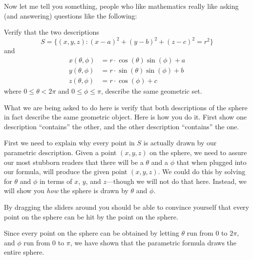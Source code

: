 \documentclass{ximera}
\begin{document}
 Now let me tell you something, people
who like mathematics really like asking (and answering) questions like
the following:

\begin{example}
  Verify that the two descriptions
  \[
  S = \{(x,y,z):(x-a)^2+(y-b)^2+(z-c)^2=r^2\}
  \]
  and
  \begin{align*}
    x(\theta,\phi) &=r\cdot\cos(\theta)\sin(\phi)+a\\
    y(\theta,\phi) &=r\cdot\sin(\theta)\sin(\phi)+b\\
    z(\theta,\phi) &=r\cdot\cos(\phi)+c
  \end{align*}
  where $0\le \theta<2\pi$ and $0\le \phi\le \pi$, describe the same
  geometric set.
  \begin{explanation}
    What we are being asked to do here is verify that both
    descriptions of the sphere in fact describe the same geometric
    object.  Here is how you do it. First show one description
    ``contains'' the other, and the other description ``contains'' the
    one.


First we need to explain why every point in $S$ is actually drawn by
    our parametric description. Given a point $(x,y,z)$ on the sphere,
    we need to assure our most stubborn readers that there will be a
    $\theta$ and a $\phi$ that when plugged into our formula, will
    produce the given point $(x,y,z)$. We could do this by solving for
    $\theta$ and $\phi$ in terms of $x$, $y$, and $z$---though we will
    not do that here. Instead, we will show you \textit{how} the
    sphere is drawn by $\theta$ and $\phi$.
 
      
      \begin{onlineOnly}
        By dragging the sliders around you should be able to convince yourself that every point on the sphere can be hit by the point on the sphere.
        
        \begin{center}
        \end{center}
      \end{onlineOnly}
 
      Since every point on the sphere can be obtained by letting
      $\theta$ run from $0$ to $2\pi$, and $\phi$ run from $0$ to
      $\pi$, we have shown that the parametric formula draws the
      entire sphere.



\end{explanation}
\end{example}
\end{document}

